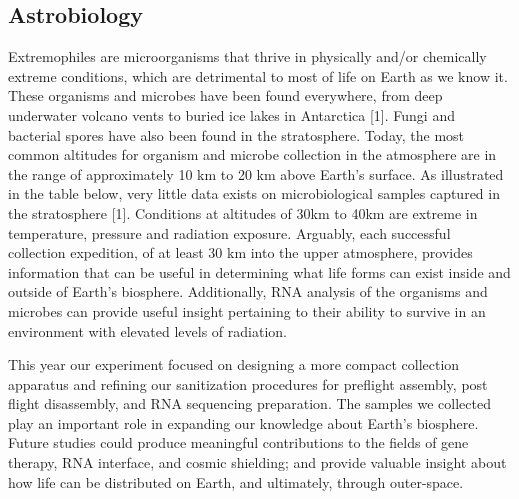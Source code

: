 \subsection{Astrobiology}
\label{sec:Astrobiology-Background}
Extremophiles are microorganisms that thrive in physically and/or chemically extreme conditions, which are detrimental to most of life on Earth as we know it. These organisms and microbes have been found everywhere, from deep underwater volcano vents to buried ice lakes in Antarctica [1]. Fungi and bacterial spores have also been found in the stratosphere. Today, the most common altitudes for organism and microbe collection in the atmosphere are in the range of approximately 10 km to 20 km above Earth’s surface. As illustrated in the table below, very little data exists on microbiological samples captured in the stratosphere [1]. Conditions at altitudes of 30km to 40km are extreme in temperature, pressure and radiation exposure. Arguably, each successful collection expedition, of at least 30 km into the upper atmosphere, provides information that can be useful in determining what life forms can exist inside and outside of Earth’s biosphere. Additionally, RNA analysis of the organisms and microbes can provide useful insight pertaining to their ability to survive in an environment with elevated levels of radiation.  

This year our experiment focused on designing a more compact collection apparatus and refining our sanitization procedures for preflight assembly, post flight disassembly, and RNA sequencing preparation. The samples we collected play an important role in expanding our knowledge about Earth’s biosphere. Future studies could produce meaningful contributions to the fields of gene therapy, RNA interface, and cosmic shielding; and provide valuable insight about how life can be distributed on Earth, and ultimately, through outer-space.

